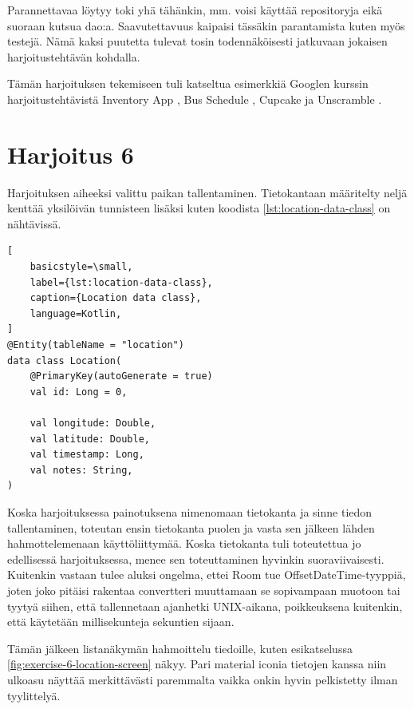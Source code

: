 Parannettavaa löytyy toki yhä tähänkin, mm. voisi käyttää repositoryja eikä
suoraan kutsua dao:a. Saavutettavuus kaipaisi tässäkin parantamista kuten myös
testejä. Nämä kaksi puutetta tulevat tosin todennäköisesti jatkuvaan jokaisen
harjoitustehtävän kohdalla.

Tämän harjoituksen tekemiseen tuli katseltua esimerkkiä Googlen kurssin
harjoitustehtävistä Inventory App \parencite{GithubGoogleDevTrainingInventory},
Bus Schedule \parencite{GithubGoogleDevTrainingBusSchedule}, Cupcake
\parencite{GithubGoogleDevTrainingCupcake} ja Unscramble
\parencite{GithubGoogleDevTrainingUnscramble}.

\section{Harjoitus 6}

Harjoituksen aiheeksi valittu paikan tallentaminen. Tietokantaan määritelty
neljä kenttää yksilöivän tunnisteen lisäksi kuten koodista
\ref{lst:location-data-class} on nähtävissä.

\begin{lstlisting}[
    basicstyle=\small,
    label={lst:location-data-class},
    caption={Location data class},
    language=Kotlin,
]
@Entity(tableName = "location")
data class Location(
    @PrimaryKey(autoGenerate = true)
    val id: Long = 0,

    val longitude: Double,
    val latitude: Double,
    val timestamp: Long,
    val notes: String,
)
\end{lstlisting}

Koska harjoituksessa painotuksena nimenomaan tietokanta ja sinne tiedon
tallentaminen, toteutan ensin tietokanta puolen ja vasta sen jälkeen lähden
hahmottelemenaan käyttöliittymää. Koska tietokanta tuli toteutettua jo
edellisessä harjoituksessa, menee sen toteuttaminen hyvinkin suoraviivaisesti.
Kuitenkin vastaan tulee aluksi ongelma, ettei Room tue OffsetDateTime-tyyppiä,
joten joko pitäisi rakentaa convertteri muuttamaan se sopivampaan muotoon tai
tyytyä siihen, että tallennetaan ajanhetki UNIX-aikana, poikkeuksena kuitenkin,
että käytetään millisekunteja sekuntien sijaan.

Tämän jälkeen listanäkymän hahmoittelu tiedoille, kuten esikatselussa
\ref{fig:exercise-6-location-screen} näkyy. Pari material iconia tietojen
kanssa niin ulkoasu näyttää merkittävästi paremmalta vaikka onkin hyvin
pelkistetty ilman tyylittelyä.

